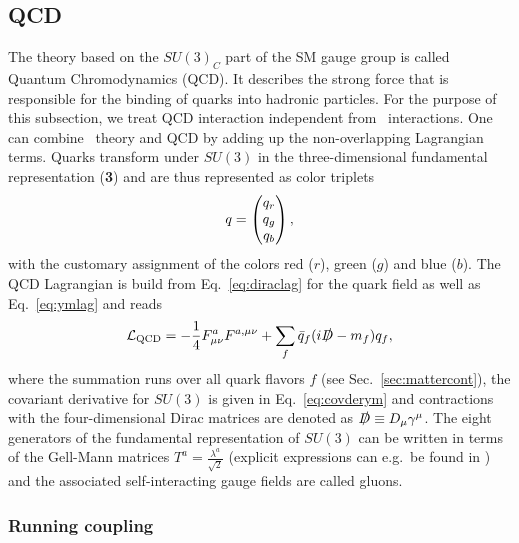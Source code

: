\subsection{QCD}
The theory based on the $SU(3)_C$ part of the SM gauge group is called
Quantum Chromodynamics (QCD). It describes the strong force that is
responsible for the binding of quarks into hadronic particles. For the
purpose of this subsection, we treat QCD interaction independent from \ew~interactions. One can combine \ew~theory and QCD by adding up
the non-overlapping Lagrangian terms. Quarks transform
under $SU(3)$ in the three-dimensional fundamental representation
(\textbf{3}) and are thus represented as color triplets
\begin{align}
  q = \pmqty{q_r\\q_g\\q_b},
\end{align}
with the customary assignment of the colors red ($r$), green ($g$) and blue ($b$). The QCD Lagrangian
is build from Eq.~\eqref{eq:diraclag} for the quark field as well as
Eq.~\eqref{eq:ymlag} and reads
\begin{align}\label{eq:qcdlag}
  \mathcal{L}_{\text{QCD}} = -\frac{1}{4}F^a_{\mu\nu}F^{a,\mu\nu} + \sum_f
  \bar{q}_f (i \slashed{D}  -m_f) q_f ,
\end{align}
where the summation runs over all quark flavors $f$ (see Sec.~\ref{sec:mattercont}), the covariant derivative for $SU(3)$ is given in Eq.~\eqref{eq:covderym} and contractions with the four-dimensional
Dirac matrices are denoted as $\slashed{D} \equiv D_\mu \gamma^\mu$. The eight generators of the fundamental
representation of $SU(3)$ can be written in terms of the Gell-Mann
matrices $T^a = \frac{\lambda^a}{\sqrt{2}}$ (explicit expressions can e.g.~be
found in \cite{Schwartz:2013pla}) and the associated
self-interacting gauge fields are called gluons. 

\subsubsection{Running coupling}
\label{sec:runcoup}

